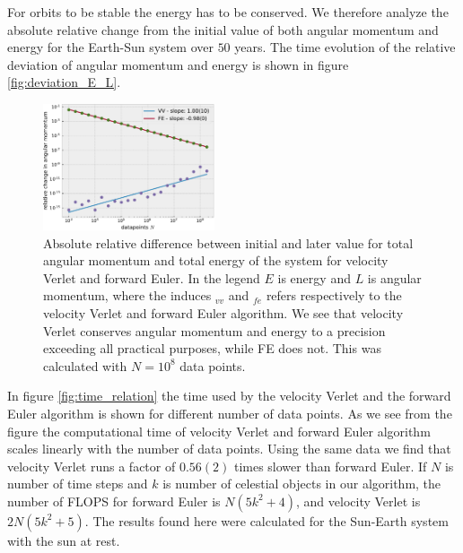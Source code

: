 \documentclass[%
 reprint,
nofootinbib,
aps,
]{revtex4-1}
\begin{document}
For orbits to be stable the energy has to be conserved. We therefore analyze the absolute relative change from the initial value of both angular momentum and energy for the Earth-Sun system over $50$ years. The time evolution of the relative deviation of angular momentum and energy is shown in figure \vref{fig:deviation_E_L}.

\begin{figure}
  \centering
  \includegraphics[width=0.45\textwidth]{../figures/deviation_E_L.pdf}
  \caption{Absolute relative difference between initial and later value for total angular momentum and total energy of the system for velocity Verlet and forward Euler. In the legend $E$ is energy and $L$ is angular momentum, where the induces $_{vv}$ and $_{fe}$ refers respectively to the velocity Verlet and forward Euler algorithm. We see that velocity Verlet conserves angular momentum and energy to a precision exceeding all practical purposes, while FE does not. This was calculated with $N=10^{8}$ data points.}
  \label{fig:deviation_E_L}
\end{figure}

In figure \vref{fig:time_relation} the time used by the velocity Verlet and the forward Euler algorithm is shown for different number of data points. As we see from the figure the computational time of velocity Verlet and forward Euler algorithm scales linearly with the number of data points. Using the same data we find that velocity Verlet runs a factor of $0.56(2)$ times slower than forward Euler. If $N$ is number of time steps and $k$ is number of celestial objects in our algorithm, the number of FLOPS for forward Euler is $N\left(5k^2+4\right)$, and velocity Verlet is $2N\left(5k^2 +5\right)$. The results found here were calculated for the Sun-Earth system with the sun at rest.
\end{document}
